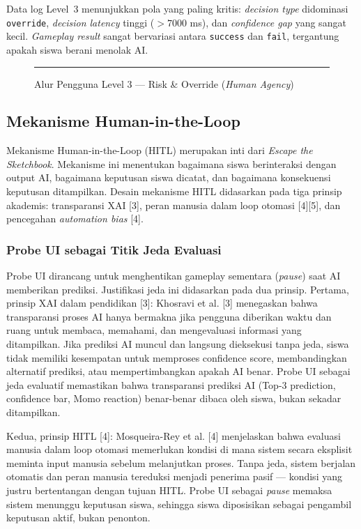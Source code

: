 \documentclass[12pt,oneside]{report}
\begin{document}
Data log Level~3 menunjukkan pola yang paling kritis: \textit{decision type} didominasi \texttt{override}, \textit{decision latency} tinggi ($>7000$ ms), dan \textit{confidence gap} yang sangat kecil. \textit{Gameplay result} sangat bervariasi antara \texttt{success} dan \texttt{fail}, tergantung apakah siswa berani menolak AI.

\begin{figure}[H]
    \centering
    \rule{0.9\textwidth}{6cm}
    \caption{Alur Pengguna Level 3 --- Risk \& Override (\textit{Human Agency})}
    \label{fig:level3-flow}
\end{figure}


\subsection{Mekanisme Human-in-the-Loop}
\label{subsec:mekanisme-hitl}

Mekanisme Human-in-the-Loop (HITL) merupakan inti dari \textit{Escape the Sketchbook}. Mekanisme ini menentukan bagaimana siswa berinteraksi dengan output AI, bagaimana keputusan siswa dicatat, dan bagaimana konsekuensi keputusan ditampilkan. Desain mekanisme HITL didasarkan pada tiga prinsip akademis: transparansi XAI [3], peran manusia dalam loop otomasi [4][5], dan pencegahan \textit{automation bias} [4].

\subsubsection{Probe UI sebagai Titik Jeda Evaluasi}

Probe UI dirancang untuk menghentikan gameplay sementara (\textit{pause}) saat AI memberikan prediksi. Justifikasi jeda ini didasarkan pada dua prinsip. Pertama, prinsip XAI dalam pendidikan [3]: Khosravi et al. [3] menegaskan bahwa transparansi proses AI hanya bermakna jika pengguna diberikan waktu dan ruang untuk membaca, memahami, dan mengevaluasi informasi yang ditampilkan. Jika prediksi AI muncul dan langsung dieksekusi tanpa jeda, siswa tidak memiliki kesempatan untuk memproses confidence score, membandingkan alternatif prediksi, atau mempertimbangkan apakah AI benar. Probe UI sebagai jeda evaluatif memastikan bahwa transparansi prediksi AI (Top-3 prediction, confidence bar, Momo reaction) benar-benar dibaca oleh siswa, bukan sekadar ditampilkan.

Kedua, prinsip HITL [4]: Mosqueira-Rey et al. [4] menjelaskan bahwa evaluasi manusia dalam loop otomasi memerlukan kondisi di mana sistem secara eksplisit meminta input manusia sebelum melanjutkan proses. Tanpa jeda, sistem berjalan otomatis dan peran manusia tereduksi menjadi penerima pasif --- kondisi yang justru bertentangan dengan tujuan HITL. Probe UI sebagai \textit{pause} memaksa sistem menunggu keputusan siswa, sehingga siswa diposisikan sebagai pengambil keputusan aktif, bukan penonton.
\end{document}
